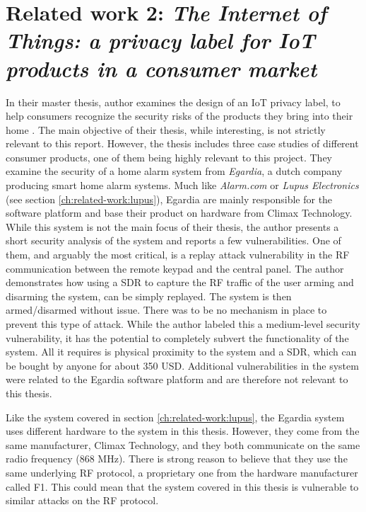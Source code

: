 \section{Related work 2: \textit{The Internet of Things: a privacy label for IoT products in a consumer market}}
In their master thesis, author \citeauthor{iotprivacylabel} examines the design of an IoT privacy label, to help consumers recognize the security risks of the products they bring into their home \cite{iotprivacylabel}. The main objective of their thesis, while interesting, is not strictly relevant to this report. However, the thesis includes three case studies of different consumer products, one of them being highly relevant to this project. They examine the security of a home alarm system from \textit{Egardia}, a dutch company producing smart home alarm systems. Much like \textit{Alarm.com} or \textit{Lupus Electronics} (see section \ref{ch:related-work:lupus}), Egardia are mainly responsible for the software platform and base their product on hardware from Climax Technology. While this system is not the main focus of their thesis, the author presents a short security analysis of the system and reports a few vulnerabilities. One of them, and arguably the most critical, is a replay attack vulnerability in the \gls{RF} communication between the remote keypad and the central panel. The author demonstrates how using a \gls{SDR} to capture the \gls{RF} traffic of the user arming and disarming the system, can be simply replayed. The system is then armed/disarmed without issue. There was to be no mechanism in place to prevent this type of attack. While the author labeled this a medium-level security vulnerability, it has the potential to completely subvert the functionality of the system. All it requires is physical proximity to the system and a \gls{SDR}, which can be bought by anyone for about 350 USD. Additional vulnerabilities in the system were related to the Egardia software platform and are therefore not relevant to this thesis.

Like the system covered in section \ref{ch:related-work:lupus}, the Egardia system uses different hardware to the system in this thesis. However, they come from the same manufacturer, Climax Technology, and they both communicate on the same radio frequency (868 MHz). There is strong reason to believe that they use the same underlying \gls{RF} protocol, a proprietary one from the hardware manufacturer called F1. This could mean that the system covered in this thesis is vulnerable to similar attacks on the \gls{RF} protocol.

